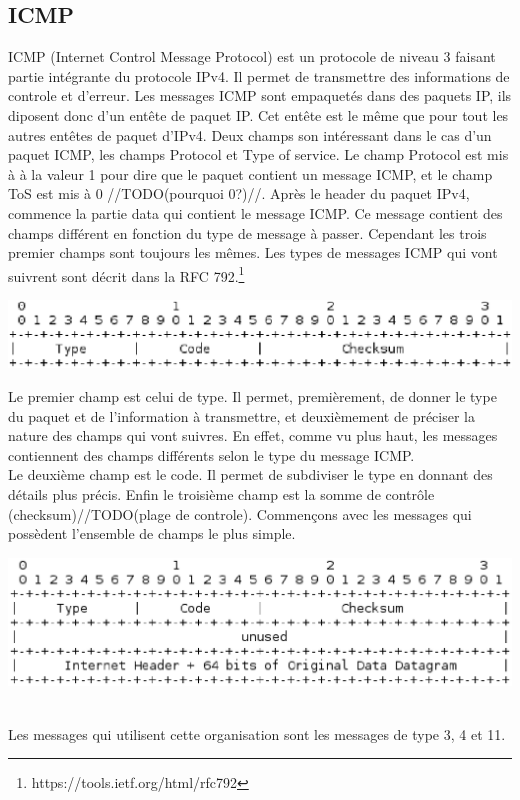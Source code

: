 \subsection{ICMP} ICMP (Internet Control Message Protocol) est un protocole de
niveau 3 faisant partie intégrante du protocole IPv4. Il permet de transmettre
des informations de controle et d'erreur. Les messages ICMP sont empaquetés
dans des paquets IP, ils diposent donc d'un entête de paquet IP. Cet entête est
le même que pour tout les autres entêtes de paquet d'IPv4. Deux champs son
intéressant dans le cas d'un paquet ICMP, les champs Protocol et Type of
service. Le champ Protocol est mis à à la valeur 1 pour dire que le paquet
contient un message ICMP, et le champ ToS est mis à 0 //TODO(pourquoi 0?)//.
Après le header du paquet IPv4, commence la partie data qui contient le message
ICMP. Ce message contient des champs différent en fonction du type de message à
passer. Cependant les trois premier champs sont toujours les mêmes.  Les types
de messages ICMP qui vont suivrent sont décrit dans la RFC
792.\footnote{https://tools.ietf.org/html/rfc792}

\includegraphics[width=15cm]{./pics/header.eps}

Le premier champ est celui de type. Il permet, premièrement, de donner le type
du paquet et de l'information à transmettre, et deuxièmement de préciser la
nature des champs qui vont suivres. En effet, comme vu plus haut, les messages
contiennent des champs différents selon le type du message ICMP.  \\Le deuxième
champ est le code. Il permet de subdiviser le type en donnant des détails plus
précis. Enfin le troisième champ est la somme de contrôle
(checksum)//TODO(plage de controle).  Commençons avec les messages qui
possèdent l'ensemble de champs le plus simple.

\includegraphics[width=15cm]{./pics/header1.eps}

\\Les messages qui utilisent cette organisation sont les messages de type 3, 4
et 11.

